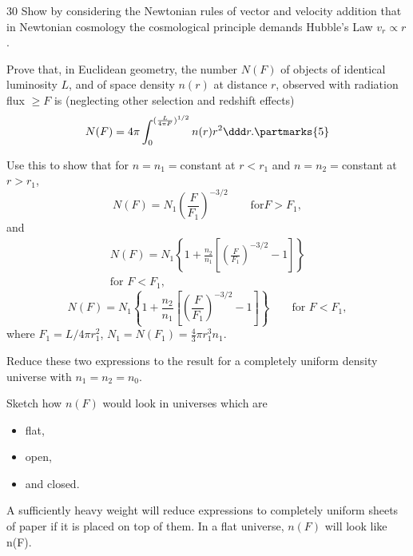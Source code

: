 \documentclass[compose]{exam-n}
\begin{document}
\begin{question}{30} 
Show by considering the Newtonian rules of vector and velocity
addition that in Newtonian cosmology the cosmological principle
demands Hubble's Law $v_r\propto r$.

Prove that, in Euclidean geometry, the number $N(F)$  of objects
of identical luminosity $L$, and of space density  $n(r)$ at
distance $r$, observed with radiation flux $\ge F$  is (neglecting
other selection and redshift effects)
\begin{equation*}
N(F)=4\pi\int_0^{(\frac{L}{4\pi F})^{1/2}} n(r) r^2\ddd r.
\partmarks{5}
\end{equation*}

Use this to show that for  $n=n_1=$constant at $r<r_1$ and
$n=n_2=$constant at $r>r_1$,
\begin{equation*}
N(F) = N_1\left(\frac{F}{F_1}\right)^{-3/2}\qquad \text{for
$F>F_1$},
\end{equation*}
and
\ifbigfont
  \begin{multline*}
  N(F) =
  N_1\left\{1+\frac{n_2}{n_1}\left[\left(\frac{F}{F_1}\right)^{-3/2}-1\right]
  \right\}\\\text{for $F<F_1$},
  \end{multline*}
\else
  \begin{equation*}
  N(F) =
  N_1\left\{1+\frac{n_2}{n_1}\left[\left(\frac{F}{F_1}\right)^{-3/2}-1\right]
  \right\} \qquad \text{for $F<F_1$},
  \end{equation*}
\fi
where $F_1=L/4\pi r_1^2$, $N_1=N(F_1)=\frac{4}{3}\pi r_1^3 n_1$.

Reduce these two expressions to the result for a completely
uniform density universe with  $n_1=n_2=n_0$.

Sketch how $n(F)$  would look in universes which are
\begin{itemize}
\item flat,
\item open,
\item and closed.
\end{itemize}

\begin{solution}
A sufficiently heavy weight will reduce expressions to completely
uniform sheets of paper if it is placed on top of them.
In a flat universe, $n(F)$ will look like n(F).
\end{solution}
\end{question}
\end{document}
